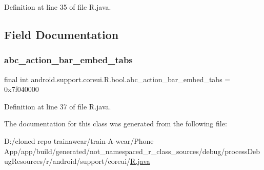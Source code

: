 Definition at line 35 of file R.\+java.


\begin{DoxyCode}{0}

\end{DoxyCode}


\subsection{Field Documentation}
\mbox{\label{classandroid_1_1support_1_1coreui_1_1_r_1_1bool_a8f4c5f52b403fce26b4e70370bf2e2d3}} 
\subsubsection{\texorpdfstring{abc\_action\_bar\_embed\_tabs}{abc\_action\_bar\_embed\_tabs}}
{\footnotesize\ttfamily final int android.\+support.\+coreui.\+R.\+bool.\+abc\+\_\+action\+\_\+bar\+\_\+embed\+\_\+tabs = 0x7f040000\hspace{0.3cm}{\ttfamily [static]}}



Definition at line 37 of file R.\+java.



The documentation for this class was generated from the following file\+:\begin{DoxyCompactItemize}
\item 
D\+:/cloned repo trainawear/train-\/\+A-\/wear/\+Phone App/app/build/generated/not\+\_\+namespaced\+\_\+r\+\_\+class\+\_\+sources/debug/process\+Debug\+Resources/r/android/support/coreui/\mbox{\hyperlink{process_debug_resources_2r_2android_2support_2coreui_2_r_8java}{R.\+java}}\end{DoxyCompactItemize}
